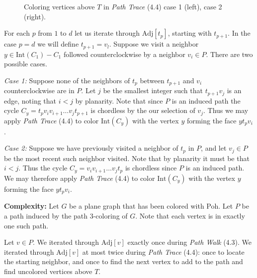 \documentclass[letterpaper, 12pt]{article}
\theoremstyle{thm}
\begin{document}
\begin{figure}
\begin{center}
\caption{Coloring vertices above $T$ in \textit{Path Trace} (4.4) case 1 (left),
case 2 (right).}
\end{center}
\end{figure}

For each $p$ from $1$ to $d$ let us iterate through
$\text{Adj}[t_p]$, starting with $t_{p+1}$. In the case $p=d$ we will define
$t_{p+1}=v_l$. Suppose we visit a neighbor $y\in \text{Int}(C_1)-C_1$ followed
counterclockwise by a neighbor $v_i\in P$. There are two possible cases.

\textit{Case 1:} Suppose none of the neighbors of $t_p$ between $t_{p+1}$ and
$v_i$ counterclockwise are in $P$. Let
$j$ be the smallest integer such that $t_{p+1}v_j$ is an edge, noting
that $i<j$ by planarity. Note that since $P$ is an induced path the cycle
$C_y=t_pv_iv_{i+1}\ldots v_jt_{p+1}$ is chordless by the our selection of $v_j$.
Thus we may apply \textit{Path Trace} (4.4) to color $\text{Int}(C_y)$ with the
vertex $y$ forming the face $yt_pv_i$.

\textit{Case 2:} Suppose we have previously visited a neighbor of $t_p$ in $P$,
and let $v_j\in P$ be the most recent such neighbor visited. Note that by planarity
it must be that $i<j$. Thus the cycle $C_y=v_iv_{i+1}\ldots v_jt_p$ is chordless
since $P$ is an induced path.
We may therefore apply \textit{Path Trace} (4.4) to color $\text{Int}(C_y)$ with
the vertex $y$ forming the face $yt_pv_i$.

\noindent\textbf{Complexity:} Let $G$ be a plane graph that has been colored
with Poh. Let $P$ be a path induced by the path $3$-coloring of $G$. Note that each
vertex is in exactly one such path.

Let $v\in P$. We iterated through $\text{Adj}[v]$ exactly once during
\textit{Path Walk} (4.3). We iterated through $\text{Adj}[v]$ at most twice
during \textit{Path Trace} (4.4): once to locate
the starting neighbor, and once to find the next vertex to add to the path and
find uncolored vertices above $T$.
\end{document}

